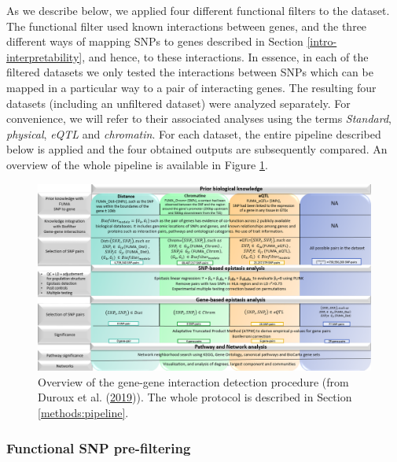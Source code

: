 \documentclass[
  11pt,
]{env/yjiao}
\begin{document}
As we describe below, we applied four different functional filters to
the dataset. The functional filter used known interactions between
genes, and the three different ways of mapping SNPs to genes described in Section
\ref{intro-interpretability}, and hence, to
these interactions. In essence, in each of the filtered datasets we only tested
the interactions between SNPs which can be mapped in a particular way to
a pair of interacting genes. The resulting four datasets
(including an unfiltered dataset) were analyzed separately. For
convenience, we will refer to their associated analyses using the terms
\emph{Standard}, \emph{physical}, \emph{eQTL} and \emph{chromatin}. For each dataset, the
entire pipeline described below is applied and the four obtained outputs
are subsequently compared. An overview of the whole pipeline is
available in Figure \ref{fig:pipeline}.



\begin{figure}
\centering
\includegraphics{fig/pipeline2.PNG}
\caption{\label{fig:pipeline}Overview of the gene-gene interaction detection procedure (from Duroux et al. (\protect\hyperlink{ref-duroux_2019_iges}{2019})). The whole protocol is described in Section \ref{methods:pipeline}.}
\end{figure}

\hypertarget{methods:prefiltering}{%
\subsubsection{Functional SNP pre-filtering}\label{methods:prefiltering}}
\end{document}
